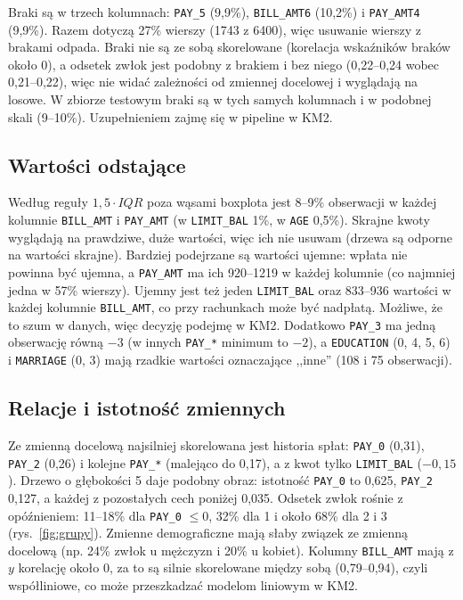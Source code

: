 \documentclass[a4paper,10pt]{article}
\begin{document}
Braki są w trzech kolumnach: \texttt{PAY\_5} (9,9\%), \texttt{BILL\_AMT6} (10,2\%) i \texttt{PAY\_AMT4} (9,9\%). Razem dotyczą 27\% wierszy (1743 z 6400), więc usuwanie wierszy z brakami odpada. Braki nie są ze sobą skorelowane (korelacja wskaźników braków około 0), a odsetek zwłok jest podobny z brakiem i bez niego (0,22--0,24 wobec 0,21--0,22), więc nie widać zależności od zmiennej docelowej i wyglądają na losowe. W zbiorze testowym braki są w tych samych kolumnach i w podobnej skali (9--10\%). Uzupełnieniem zajmę się w pipeline w KM2.

\subsection{Wartości odstające}

Według reguły $1{,}5\cdot IQR$ poza wąsami boxplota jest 8--9\% obserwacji w każdej kolumnie \texttt{BILL\_AMT} i \texttt{PAY\_AMT} (w \texttt{LIMIT\_BAL} 1\%, w \texttt{AGE} 0,5\%). Skrajne kwoty wyglądają na prawdziwe, duże wartości, więc ich nie usuwam (drzewa są odporne na wartości skrajne). Bardziej podejrzane są wartości ujemne: wpłata nie powinna być ujemna, a \texttt{PAY\_AMT} ma ich 920--1219 w każdej kolumnie (co najmniej jedna w 57\% wierszy). Ujemny jest też jeden \texttt{LIMIT\_BAL} oraz 833--936 wartości w każdej kolumnie \texttt{BILL\_AMT}, co przy rachunkach może być nadpłatą. Możliwe, że to szum w danych, więc decyzję podejmę w KM2. Dodatkowo \texttt{PAY\_3} ma jedną obserwację równą $-3$ (w innych \texttt{PAY\_*} minimum to $-2$), a \texttt{EDUCATION} (0, 4, 5, 6) i \texttt{MARRIAGE} (0, 3) mają rzadkie wartości oznaczające ,,inne'' (108 i 75 obserwacji).

\subsection{Relacje i istotność zmiennych}

Ze zmienną docelową najsilniej skorelowana jest historia spłat: \texttt{PAY\_0} (0,31), \texttt{PAY\_2} (0,26) i kolejne \texttt{PAY\_*} (malejąco do 0,17), a z kwot tylko \texttt{LIMIT\_BAL} ($-0{,}15$). Drzewo o głębokości 5 daje podobny obraz: istotność \texttt{PAY\_0} to 0,625, \texttt{PAY\_2} 0,127, a każdej z pozostałych cech poniżej 0,035. Odsetek zwłok rośnie z opóźnieniem: 11--18\% dla \texttt{PAY\_0} $\le 0$, 32\% dla 1 i około 68\% dla 2 i 3 (rys.~\ref{fig:grupy}). Zmienne demograficzne mają słaby związek ze zmienną docelową (np. 24\% zwłok u mężczyzn i 20\% u kobiet). Kolumny \texttt{BILL\_AMT} mają z $y$ korelację około 0, za to są silnie skorelowane między sobą (0,79--0,94), czyli współliniowe, co może przeszkadzać modelom liniowym w KM2.
\end{document}
